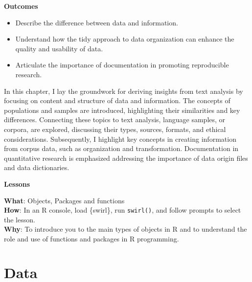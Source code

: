 \documentclass[
  letterpaper,
  krantz1]{latex/krantz-mod}
\providecommand{\tightlist}{%
  \setlength{\itemsep}{0pt}\setlength{\parskip}{0pt}}\usepackage{longtable,booktabs,array}
\theoremstyle{definition}
\theoremstyle{definition}
\theoremstyle{remark}
\begin{document}
\begin{tcolorbox}[enhanced jigsaw, leftrule=.75mm, colframe=quarto-callout-color-frame, left=2mm, colback=white, toprule=.15mm, breakable, arc=.35mm, opacityback=0, bottomrule=.15mm, rightrule=.15mm]

\textbf{ Outcomes}

\begin{itemize}
\tightlist
\item
  Describe the difference between data and information.
\item
  Understand how the tidy approach to data organization can enhance the
  quality and usability of data.
\item
  Articulate the importance of documentation in promoting reproducible
  research.
\end{itemize}

\end{tcolorbox}

In this chapter, I lay the groundwork for deriving insights from text
analysis by focusing on content and structure of data and information.
The concepts of populations and samples are introduced, highlighting
their similarities and key differences. Connecting these topics to text
analysis, language samples, or corpora, are explored, discussing their
types, sources, formats, and ethical considerations. Subsequently, I
highlight key concepts in creating information from corpus data, such as
organization and transformation. Documentation in quantitative research
is emphasized addressing the importance of data origin files and data
dictionaries.

\begin{tcolorbox}[enhanced jigsaw, leftrule=.75mm, colframe=quarto-callout-color-frame, left=2mm, colback=white, toprule=.15mm, breakable, arc=.35mm, opacityback=0, bottomrule=.15mm, rightrule=.15mm]

\textbf{ Lessons}

\textbf{What}: Objects, Packages and functions\\
\textbf{How}: In an R console, load \{swirl\}, run \texttt{swirl()}, and
follow prompts to select the lesson.\\
\textbf{Why}: To introduce you to the main types of objects in R and to
understand the role and use of functions and packages in R programming.

\end{tcolorbox}

\section{Data}\label{sec-data-data}
\end{document}
